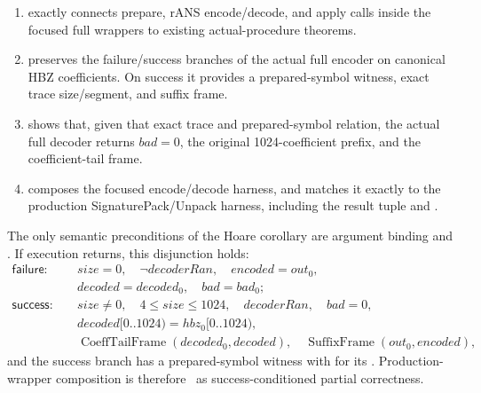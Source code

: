 \begin{enumerate}
  \item {} exactly connects prepare,
        rANS encode/decode, and apply calls inside the focused full wrappers
        to existing actual-procedure theorems.
  \item {} preserves the
        failure/success branches of the actual full encoder on canonical HBZ
        coefficients. On success it provides a prepared-symbol witness,
        exact trace size/segment, and suffix frame.
  \item {} shows that,
        given that exact trace and prepared-symbol relation, the actual full
        decoder returns \(bad=0\), the original 1024-coefficient prefix,
        and the coefficient-tail frame.
  \item {} composes
        the focused encode/decode harness, and
         matches
        it exactly to the production SignaturePack/Unpack harness, including
        the result tuple and .
\end{enumerate}

\begin{verified}
The only semantic preconditions of the Hoare corollary
 are argument binding
and . If execution returns, this disjunction
holds:
\[
\begin{aligned}
\mathsf{failure}:\quad
  &size=0,\quad \neg decoderRan,\quad encoded=out_0,\\
  &decoded=decoded_0,\quad bad=bad_0;\\[0.3em]
\mathsf{success}:\quad
  &size\ne0,\quad 4\le size\le1024,\quad decoderRan,\quad bad=0,\\
  &decoded[0..1024)=hbz_0[0..1024),\\
  &\operatorname{CoeffTailFrame}(decoded_0,decoded),\quad
    \operatorname{SuffixFrame}(out_0,encoded),
\end{aligned}
\]
and the success branch has a prepared-symbol witness with
 for its .
Production-wrapper composition is therefore \statusproved\ as
success-conditioned partial correctness.
\end{verified}


